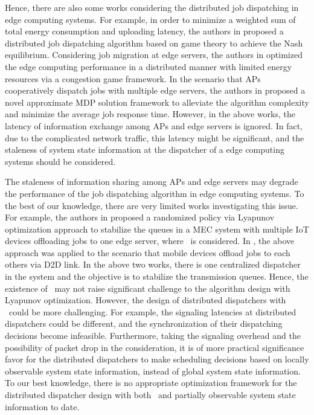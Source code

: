 Hence, there are also some works considering the distributed job dispatching in edge computing systems.
For example, in order to minimize a weighted sum of total energy consumption and uploading latency, the authors in \cite{ToN-Xuchen2016} proposed a distributed job dispatching algorithm based on game theory to achieve the Nash equilibrium. 
Considering job migration at edge servers, the authors in \cite{ToN-xujie2018} optimized the edge computing performance in a distributed manner with limited energy resources via a congestion game framework.
In the scenario that APs cooperatively dispatch jobs with multiple edge servers, the authors in \cite{mdp-jcin} proposed a novel approximate MDP solution framework to alleviate the algorithm complexity and minimize the average job response time.
However, in the above works, the latency of information exchange among APs and edge servers is ignored.
In fact, due to the complicated network traffic, this latency might be significant, and the staleness of system state information at the dispatcher of a edge computing systems should be considered.

The staleness of information sharing among APs and edge servers may degrade the performance of the job dispatching algorithm in edge computing systems.
To the best of our knowledge, there are very limited works investigating this issue.
For example, the authors in \cite{JSAC17-LyuX} proposed a randomized policy via Lyapunov optimization approach to stabilize the queues in a MEC system with multiple IoT devices offloading jobs to one edge server, where \brlatency~is considered. 
In \cite{TWC18-LyuX}, the above approach was applied to the scenario that mobile devices offload jobs to each others via D2D link.
In the above two works, there is one centralized dispatcher in the system and the objective is to stabilize the transmission queues.
Hence, the existence of \brlatency~may not raise significant challenge to the algorithm design with Lyapunov optimization.
However, the design of distributed dispatchers with \brlatency~could be more challenging.
For example, the signaling latencies at distributed dispatchers could be different, and the synchronization of their dispatching decisions become infeasible.
Furthermore, taking the signaling overhead and the possibility of packet drop in the consideration, it is of more practical significance favor for the distributed dispatchers to make scheduling decisions based on locally observable system state information, instead of global system state information.
To our best knowledge, there is no appropriate optimization framework for the distributed dispatcher design with both \brlatency~and partially observable system state information to date.

